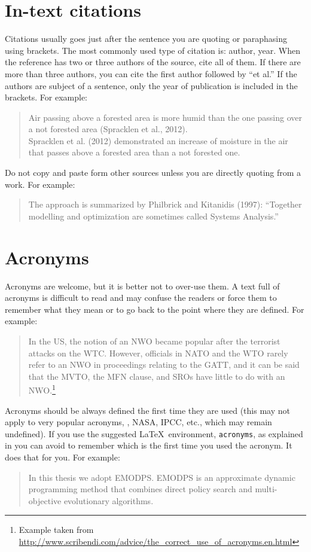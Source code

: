 \section{In-text citations}
Citations usually goes just after the sentence you are quoting or paraphasing using brackets. 
The most commonly used type of citation is: author, year. 
When the reference has two or three authors of the source, cite all of them.
If there are more than three authors, you can cite the first author followed by \enquote{et al.} 
If the authors are subject of a sentence, only the year of publication is included in the brackets.
For example: \\
\blockquote{Air passing above a forested area is more humid than the one passing over a not forested area (Spracklen et al., 2012). \\
Spracklen et al. (2012) demonstrated an increase of moisture in the air that passes above a forested area than a not forested one. }

Do not copy and paste form other sources unless you are directly quoting from a work.
For example:\\
\blockquote{The approach is summarized by Philbrick and Kitanidis (1997): \enquote{Together modelling and optimization are sometimes called Systems Analysis.}}

\section{Acronyms}
Acronyms are welcome, but it is better not to over-use them. 
A text full of acronyms is difficult to read and may confuse the readers or force them to remember what they mean or to go back to the point where they are defined.
For example:\\
\blockquote{In the US, the notion of an NWO became popular after the terrorist attacks on the WTC. However, officials in NATO and the WTO rarely refer to an NWO in proceedings relating to the GATT, and it can be said that the MVTO, the MFN clause, and SROs have little to do with an NWO.\footnote{Example taken from \url{http://www.scribendi.com/advice/the_correct_use_of_acronyms.en.html}}}.

Acronyms should be always defined the first time they are used (this may not apply to very popular acronyms, \eg, NASA, IPCC, etc., which may remain undefined).
If you use the suggested \LaTeX\ environment, \verb!acronyms!, as explained in  you can avoid to remember which is the first time you used the acronym.
It does that for you.
For example:\\
\blockquote{In this thesis we adopt \acf{EMODPS}. \ac{EMODPS} is an approximate dynamic programming method that combines direct policy search and multi-objective evolutionary algorithms.} %

